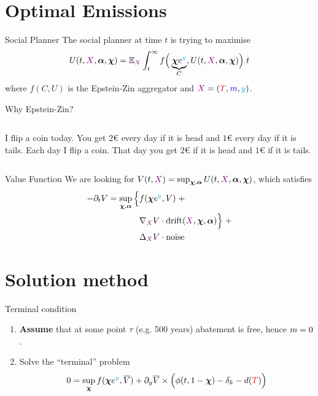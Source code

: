 \documentclass[pdf]{beamer}
\let\d\relax
\newcommand{\d}[1]{\mathrm{d}#1}
\newcommand{\control}[1]{\bm{#1}}
\newcommand{\X}{{\color{violet} X}}
\begin{document}
\section{Optimal Emissions}

\begin{frame}{Social Planner}
    The social planner at time $t$ is trying to maximise \begin{equation*}
        U(t, \X, \control{\alpha}, \control{\chi}) = \mathbb{E}_{\X} \int^\infty_t f\Big(\underbrace{\control{\chi} e^{{\color{cyan} y}}}_{C}, U(t, \X, \control{\alpha}, \control{\chi})\Big) \; \d t
    \end{equation*} where $f(C, U)$ is the Epstein-Zin aggregator and $\X = ({\color{red} T}, {\color{blue} m}, {\color{cyan} y})$.
\end{frame}

\begin{frame}{Why Epstein-Zin?}
    \begin{columns}
        I flip a coin today. You get $2$€ every day if it is head and $1$€ every day if it is tails.
        Each day I flip a coin. That day you get $2$€ if it is head and $1$€ if it is tails.
    \end{columns}
\end{frame}

\begin{frame}{Value Function}
    We are looking for $V(t, \X) = \sup_{\control{\chi}, \control{\alpha}} U(t, \X, \control{\alpha}, \control{\chi})$, which satisfies
    \begin{equation*}
        \begin{split}
            -\partial_t V = \sup_{\control{\chi}, \control{\alpha}} \Big\{ &f(\control{\chi} e^{\color{cyan} y}, V) \; +\\
            &\nabla_{\X} V \cdot \text{drift}(\X, \control{\chi}, \control{\alpha}) \Big\} \; + \\
            &\Delta_{\X} V \cdot \text{noise}
        \end{split}
    \end{equation*}
\end{frame}

\section{Solution method}
\begin{frame}{Terminal condition}
    \begin{enumerate}
        \item \textbf{Assume} that at some point $\tau$ (e.g. 500 years) abatement is free, hence $\d m = 0$.
        \item Solve the ``terminal'' problem \begin{equation*}
            0 = \sup_{\control{\chi}} f(\control{\chi} e^{\color{cyan} y}, \overline{V}) + \partial_y \overline{V} \times \Big( \phi(t, 1 - \control{\chi}) - \delta_k - d({\color{red} T}) \Big)
        \end{equation*}
    \end{enumerate}
\end{frame}
\end{document}

